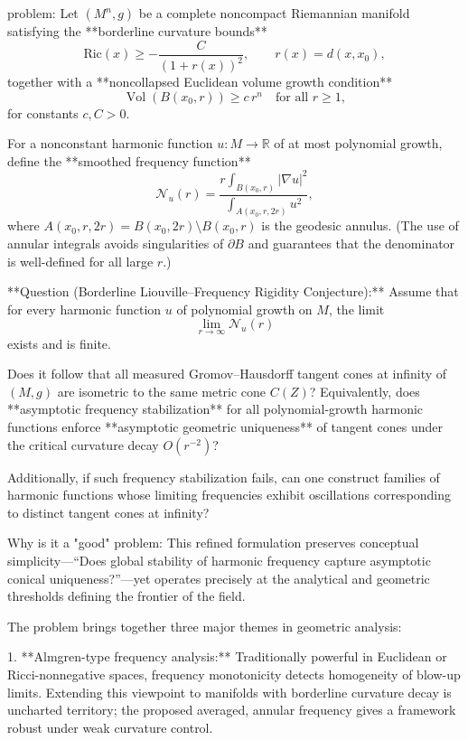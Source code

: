 problem:  
Let \( (M^n,g) \) be a complete noncompact Riemannian manifold satisfying the **borderline curvature bounds**
\[
\mathrm{Ric}(x)\ge -\frac{C}{(1+r(x))^2}, \qquad r(x)= d(x,x_0),
\]
together with a **noncollapsed Euclidean volume growth condition**
\[
\operatorname{Vol}(B(x_0,r)) \ge c\,r^n \quad \text{for all } r\ge1,
\]
for constants \(c,C>0\).  

For a nonconstant harmonic function \(u\colon M\to\mathbb{R}\) of at most polynomial growth, define the **smoothed frequency function**
\[
\mathcal{N}_u(r) = \frac{r \int_{B(x_0,r)} |\nabla u|^2}{\int_{A(x_0,r,2r)} u^2},
\]
where \(A(x_0,r,2r)=B(x_0,2r)\setminus B(x_0,r)\) is the geodesic annulus.  
(The use of annular integrals avoids singularities of \(\partial B\) and guarantees that the denominator is well-defined for all large \(r\).)

**Question (Borderline Liouville–Frequency Rigidity Conjecture):**  
Assume that for every harmonic function \(u\) of polynomial growth on \(M\), the limit
\[
\lim_{r\to\infty}\mathcal{N}_u(r)
\]
exists and is finite.  

Does it follow that all measured Gromov–Hausdorff tangent cones at infinity of \((M,g)\) are isometric to the same metric cone \(C(Z)\)?  
Equivalently, does **asymptotic frequency stabilization** for all polynomial-growth harmonic functions enforce **asymptotic geometric uniqueness** of tangent cones under the critical curvature decay \(O(r^{-2})\)?  

Additionally, if such frequency stabilization fails, can one construct families of harmonic functions whose limiting frequencies exhibit oscillations corresponding to distinct tangent cones at infinity?

Why is it a "good" problem:  
This refined formulation preserves conceptual simplicity—“Does global stability of harmonic frequency capture asymptotic conical uniqueness?”—yet operates precisely at the analytical and geometric thresholds defining the frontier of the field.  

The problem brings together three major themes in geometric analysis:

1. **Almgren-type frequency analysis:** Traditionally powerful in Euclidean or Ricci-nonnegative spaces, frequency monotonicity detects homogeneity of blow-up limits. Extending this viewpoint to manifolds with borderline curvature decay is uncharted territory; the proposed averaged, annular frequency gives a framework robust under weak curvature control.


